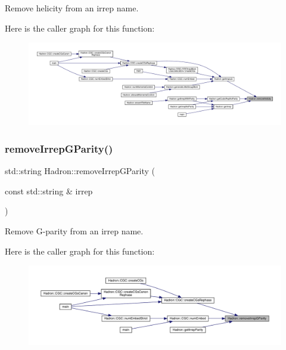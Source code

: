 Remove helicity from an irrep name. 

Here is the caller graph for this function\+:
\nopagebreak
\begin{figure}[H]
\begin{center}
\leavevmode
\includegraphics[width=350pt]{d1/daf/namespaceHadron_a877ae1e797f5cf4d4ebb7e22d5bbe69b_icgraph}
\end{center}
\end{figure}
\mbox{\label{namespaceHadron_a6c2109897dff664c15b3fe81aa7d8917}} 
\subsubsection{\texorpdfstring{removeIrrepGParity()}{removeIrrepGParity()}}
{\footnotesize\ttfamily std\+::string Hadron\+::remove\+Irrep\+G\+Parity (\begin{DoxyParamCaption}\item[{const std\+::string \&}]{irrep }\end{DoxyParamCaption})}



Remove G-\/parity from an irrep name. 

Here is the caller graph for this function\+:
\nopagebreak
\begin{figure}[H]
\begin{center}
\leavevmode
\includegraphics[width=350pt]{d1/daf/namespaceHadron_a6c2109897dff664c15b3fe81aa7d8917_icgraph}
\end{center}
\end{figure}
\mbox{\label{namespaceHadron_aff55b5fd81ffee95432b7d4e1c8d01e6}} 
